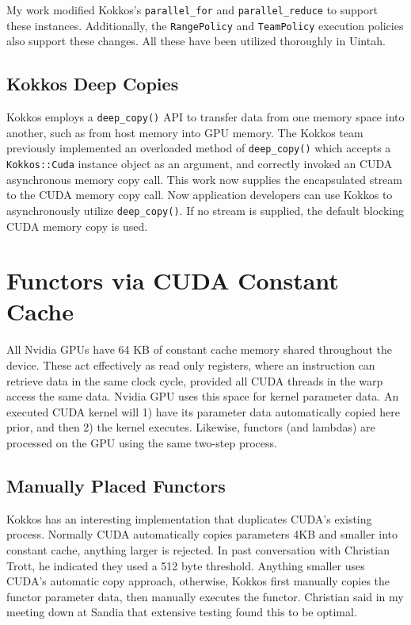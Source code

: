 \documentclass[]{article}
\begin{document}
My work modified Kokkos's \texttt{parallel\_for} and \texttt{parallel\_reduce} to support these instances.  Additionally, the \texttt{RangePolicy} and \texttt{TeamPolicy} execution policies also support these changes.  All these have been utilized thoroughly in Uintah.


\subsection{Kokkos Deep Copies}
\label{sec:kokkos_deep_copies}
%
Kokkos employs a \texttt{deep\_copy()} API to transfer data from one memory space into another, such as from host memory into GPU memory.  The Kokkos team previously implemented an overloaded method of \texttt{deep\_copy()} which accepts a \texttt{Kokkos::Cuda} instance object as an argument, and correctly invoked an CUDA asynchronous memory copy call.  This work now supplies the encapsulated stream to the CUDA memory copy call.  Now application developers can use Kokkos to asynchronously utilize \texttt{deep\_copy()}.  If no stream is supplied, the default blocking CUDA memory copy is used.


\section{Functors via CUDA Constant Cache}

All Nvidia GPUs have 64 KB of constant cache memory shared throughout the device.  These act effectively as read only registers, where an instruction can retrieve data in the same clock cycle, provided all CUDA threads in the warp access the same data.   Nvidia GPU uses this space for kernel parameter data.  An executed CUDA kernel will 1) have its parameter data automatically copied here prior, and then 2) the kernel executes.  Likewise, functors (and lambdas) are processed on the GPU using the same two-step process.  

\subsection{Manually Placed Functors}
Kokkos has an interesting implementation that duplicates CUDA's existing process.   Normally CUDA automatically copies parameters 4KB and smaller into constant cache, anything larger is rejected.  In past conversation with Christian Trott, he indicated they used a 512 byte threshold.  Anything smaller uses CUDA's automatic copy approach, otherwise, Kokkos first manually copies the functor parameter data, then manually executes the functor.   Christian said in my meeting down at Sandia that extensive testing found this to be optimal.  
\end{document}
